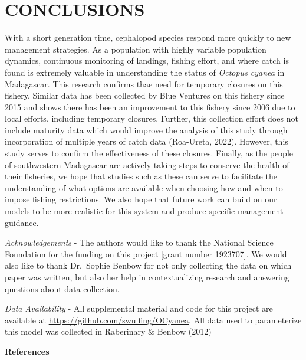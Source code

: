 \documentclass[
]{article}
\begin{document}
\hypertarget{conclusions}{%
\section{CONCLUSIONS}\label{conclusions}}

With a short generation time, cephalopod species respond more quickly to new management strategies. As a population with highly variable population dynamics, continuous monitoring of landings, fishing effort, and where catch is found is extremely valuable in understanding the status of \emph{Octopus cyanea} in Madagascar. This research confirms thae need for temporary closures on this fishery. Similar data has been collected by Blue Ventures on this fishery since 2015 and shows there has been an improvement to this fishery since 2006 due to local efforts, including temporary closures. Further, this collection effort does not include maturity data which would improve the analysis of this study through incorporation of multiple years of catch data (Roa-Ureta, 2022). However, this study serves to confirm the effectiveness of these closures. Finally, as the people of southwestern Madagascar are actively taking steps to conserve the health of their fisheries, we hope that studies such as these can serve to facilitate the understanding of what options are available when choosing how and when to impose fishing restrictions. We also hope that future work can build on our models to be more realistic for this system and produce specific management guidance.

\emph{Acknowledgements} - The authors would like to thank the National Science Foundation for the funding on this project {[}grant number 1923707{]}. We would also like to thank Dr.~Sophie Benbow for not only collecting the data on which paper was written, but also her help in contextualizing research and answering questions about data collection.

\emph{Data Availability} - All supplemental material and code for this project are available at \url{https://github.com/swulfing/OCyanea}. All data used to parameterize this model was collected in Raberinary \& Benbow (2012)

\newpage

\textbf{References}
\end{document}
